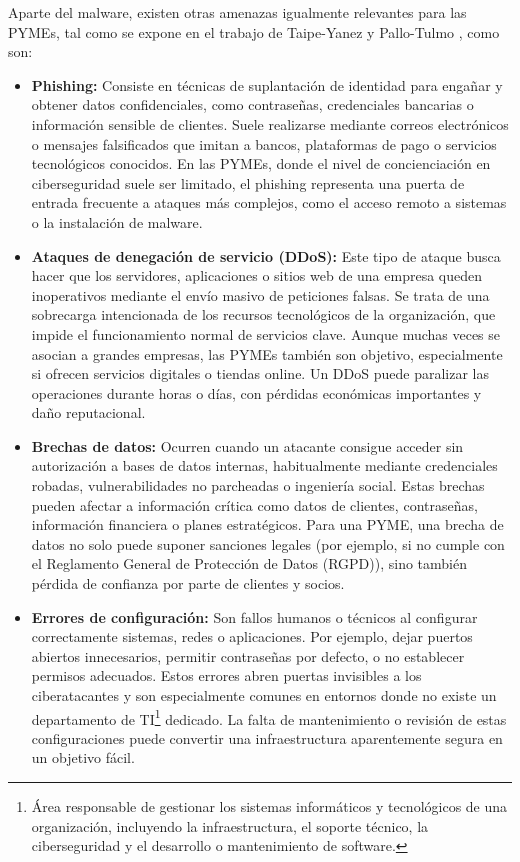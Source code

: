 \documentclass[a4paper, 11pt]{article}
\begin{document}
Aparte del malware, existen otras amenazas igualmente relevantes para las PYMEs, tal como se expone en el trabajo de Taipe-Yanez y Pallo-Tulmo \cite{vuln}, como son: 

\begin{itemize}
    \item \textbf{Phishing:}  
    Consiste en técnicas de suplantación de identidad para engañar y obtener datos confidenciales, como contraseñas, credenciales bancarias o información sensible de clientes. Suele realizarse mediante correos electrónicos o mensajes falsificados que imitan a bancos, plataformas de pago o servicios tecnológicos conocidos. En las PYMEs, donde el nivel de concienciación en ciberseguridad suele ser limitado, el phishing representa una puerta de entrada frecuente a ataques más complejos, como el acceso remoto a sistemas o la instalación de malware. 
    \vspace{0.3cm}

    \item \textbf{Ataques de denegación de servicio (DDoS):}  
    Este tipo de ataque busca hacer que los servidores, aplicaciones o sitios web de una empresa queden inoperativos mediante el envío masivo de peticiones falsas. Se trata de una sobrecarga intencionada de los recursos tecnológicos de la organización, que impide el funcionamiento normal de servicios clave. Aunque muchas veces se asocian a grandes empresas, las PYMEs también son objetivo, especialmente si ofrecen servicios digitales o tiendas online. Un DDoS puede paralizar las operaciones durante horas o días, con pérdidas económicas importantes y daño reputacional. 
    \vspace{0.3cm}

    \item \textbf{Brechas de datos:}  
    Ocurren cuando un atacante consigue acceder sin autorización a bases de datos internas, habitualmente mediante credenciales robadas, vulnerabilidades no parcheadas o ingeniería social. Estas brechas pueden afectar a información crítica como datos de clientes, contraseñas, información financiera o planes estratégicos. Para una PYME, una brecha de datos no solo puede suponer sanciones legales (por ejemplo, si no cumple con el Reglamento General de Protección de Datos (RGPD)), sino también pérdida de confianza por parte de clientes y socios. 
    \vspace{0.3cm}

    \item \textbf{Errores de configuración:}  
    Son fallos humanos o técnicos al configurar correctamente sistemas, redes o aplicaciones. Por ejemplo, dejar puertos abiertos innecesarios, permitir contraseñas por defecto, o no establecer permisos adecuados. Estos errores abren puertas invisibles a los ciberatacantes y son especialmente comunes en entornos donde no existe un departamento de TI\footnote{Área responsable de gestionar los sistemas informáticos y tecnológicos de una organización, incluyendo la infraestructura, el soporte técnico, la ciberseguridad y el desarrollo o mantenimiento de software.} dedicado. La falta de mantenimiento o revisión de estas configuraciones puede convertir una infraestructura aparentemente segura en un objetivo fácil.


\end{itemize}
\end{document}
